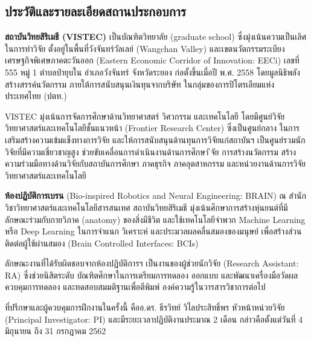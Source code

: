 \documentclass[16pt,a4]{internshipreport}
\begin{document}
\subsection{ประวัติและรายละเอียดสถานประกอบการ}
\textbf{สถาบันวิทยสิริเมธี (VISTEC)} เป็นบัณฑิตวิทยาลัย (graduate school) ซึ่งมุ่งเน้นความเป็นเลิศในการทำวิจัย 
ตั้งอยู่ในพื้นที่วังจันทร์วัลเลย์ (Wangchan Valley) และเขตนวัตกรรมระเบียงเศรษฐกิจพิเศษภาคตะวันออก
(Eastern Economic Corridor of Innovation: EECi) เลขที่ 555 หมู่ 1 ตำบลป่ายุบใน อำเภอวังจันทร์ จังหวัดระยอง
ก่อตั้งขึ้นเมื่อปี พ.ศ. 2558 โดยมูลนิธิพลังสร้างสรรค์นวัตกรรม ภายใต้การสนับสนุนเงินทุนจากบริษัท
ในกลุ่มของการปิโตรเลียมแห่งประเทศไทย (ปตท.)

VISTEC มุ่งเน้นการจัดการศึกษาด้านวิทยาศาสตร์ วิศวกรรม และเทคโนโลยี โดยมีศูนย์วิจัยวิทยาศาสตร์และเทคโนโลยีชั้นแนวหน้า
(Frontier Research Center) ซึ่งเป็นศูนย์กลาง ในการเสริมสร้างความเข้มแข็งทางการวิจัย
และให้การสนับสนุนด้านทุนการวิจัยแก่สถาบันฯ เป็นศูนย์รวมนักวิจัยที่มีความเชี่ยวชาญสูง ช่วยขับเคลื่อนการดำเนินงานด้านการศึกษา 
ิจัย การสร้างนวัตกรรม สร้างความร่วมมือทางด้านวิจัยกับสถาบันการศึกษา ภาคธุรกิจ ภาคอุตสาหกรรม
และหน่วยงานด้านการวิจัยวิทยาศาสตร์และเทคโนโลยี

\textbf{ห้องปฏิบัติการเบรน} (Bio-inspired Robotics and Neural Engineering: BRAIN)
ณ สำนักวิชาวิทยาศาสตร์และเทคโนโลยีสารสนเทศ สถาบันวิทยสิริเมธี มุ่งเน้นศึกษาการสร้างหุ่นยนต์ที่มีลักษณะร่วมกับกายวิภาค (anatomy) ของสิ่งมีชีวิต และใช้เทคโนโลยีจำพวก Machine Learning หรือ Deep Learning ในการจำแนก วิเคราะห์
และประมวลผลคลื่นสมองของมนุษย์ เพื่อสร้างส่วนติดต่อผู้ใช้ผ่านสมอง (Brain Controlled Interfaces: BCIs)

ลักษณะงานที่ได้รับผิดชอบจากห้องปฏิบัติการฯ เป็นงานของผู้ช่วยนักวิจัย (Research Assistant: RA) ซึ่งช่วยนิสิตระดับ
บัณฑิตศึกษาในการเตรียมการทดลอง ออกแบบ และพัฒนาเครื่องมือวัดผล ควบคุมการทดลอง และทดสอบสมมติฐานเพื่อตีพิมพ์
องค์ความรู้ในวารสารวิชาการต่อไป

ที่ปรึกษาและผู้ควบคุมการฝึกงานในครั้งนี้ คืออ.ดร. ธีรวิทย์ วิไลประสิทธิ์พร หัวหน้าหน่วยวิจัย (Principal Investigator: PI)
และมีระยะเวลาปฏิบัติงานประมาณ 2 เดือน กล่าวคือตั้งแต่วันที่ 4 มิถุนายน ถึง 31 กรกฎาคม 2562
\end{document}
